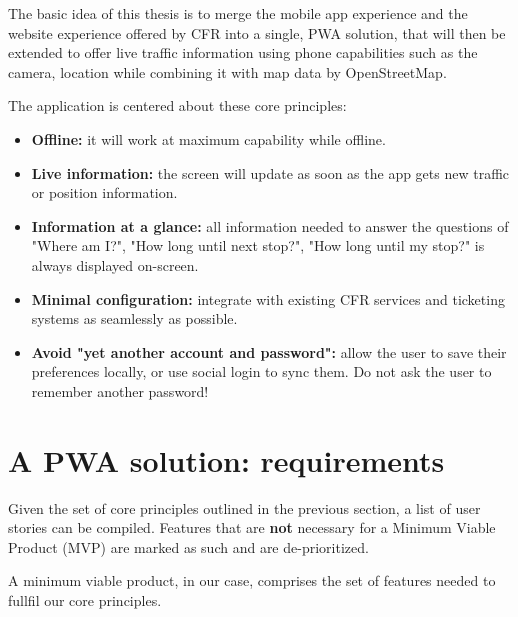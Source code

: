 The basic idea of this thesis is to merge the mobile app experience and the website experience offered by CFR into a single, PWA solution, that will then be extended to offer live traffic information using phone capabilities such as the camera, location while combining it with map data by OpenStreetMap.

The application is centered about these core principles:

\begin{itemize}
    \item \textbf{Offline:} it will work at maximum capability while offline.
    \item \textbf{Live information:} the screen will update as soon as the app gets new traffic or position information.
    \item \textbf{Information at a glance:} all information needed to answer the questions of "Where am I?", "How long until next stop?", "How long until my stop?" is always displayed on-screen.
    \item \textbf{Minimal configuration:} integrate with existing CFR services and ticketing systems as seamlessly as possible.
    \item \textbf{Avoid "yet another account and password":} allow the user to save their preferences locally, or use social login to sync them. Do not ask the user to remember another password!
\end{itemize}

\section{A PWA solution: requirements}

Given the set of core principles outlined in the previous section, a list of user stories can be compiled. Features that are \textbf{not} necessary for a Minimum Viable Product (MVP) are marked as such and are de-prioritized.

A minimum viable product, in our case, comprises the set of features needed to fullfil our core principles.

